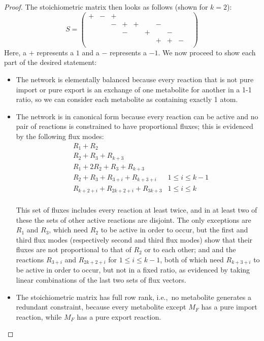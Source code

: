 \documentclass{bioinfo}
\theoremstyle{plain}
\theoremstyle{definition}
\begin{document}
\begin{proof}
The stoichiometric matrix then looks as follows (shown for $k = 2$):
\[
S = 
\begin{pmatrix}
+ & - & + &   &   &   &   &   &   & \\
  &   & - & + & + &   & - &   &   & \\
  &   &   & - &   & + &   & - &   & \\
  &   &   &   &   &   & + & + & - & \\  
\end{pmatrix}
\]
Here, a $+$ represents a $1$ and a $-$ represents a $-1$. We now proceed to show each part of the desired statement:
\begin{itemize}
\item The network is elementally balanced because every reaction that is not pure import or pure export is an exchange of one metabolite for another in a 1-1 ratio, so we can consider each metabolite as containing exactly 1 atom.
\item The network is in canonical form because every reaction can be active and no pair of reactions is constrained to have proportional fluxes; this is evidenced by the following flux modes:
\begin{align*}
& R_1 + R_2 \\
& R_2 + R_3 + R_{k+3} \\
& R_1 + 2R_2 + R_3 + R_{k+3}\\
& R_2 + R_3 + R_{3 + i} + R_{k + 3 + i} & 1 \leq i \leq k-1\\
& R_{k + 2 + i} + R_{2k + 2 + i} + R_{3k+3} & 1 \leq i \leq k\\
\end{align*}
\vspace{-1cm}

This set of fluxes includes every reaction at least twice, and in at least two of these the sets of other active reactions are disjoint. The only exceptions are $R_1$ and $R_3$, which need $R_2$ to be active in order to occur, but the first and third flux modes (respectively second and third flux modes) show that their fluxes are not proportional to that of $R_2$ or to each other; and and the reactions $R_{3+i}$ and $R_{2k+2+i}$ for $1 \leq i \leq k-1$, both of which need $R_{k+3+i}$ to be active in order to occur, but not in a fixed ratio, as evidenced by taking linear combinations of the last two sets of flux vectors.

\item The stoichiometric matrix has full row rank, i.e.,~no metabolite generates a redundant constraint, because every metabolite except $M_F$ has a pure import reaction, while $M_F$ has a pure export reaction.


\end{itemize}
\end{proof}
\end{document}

